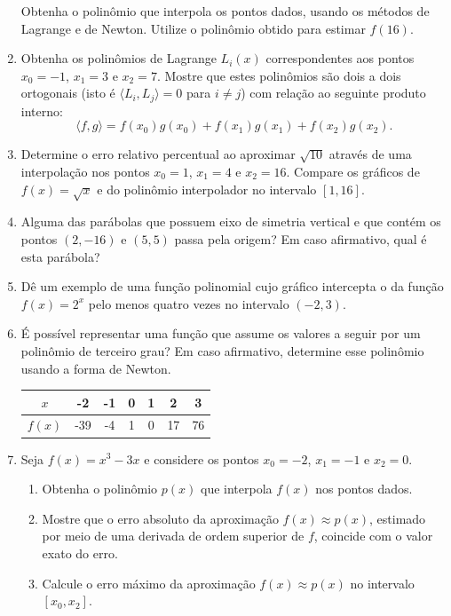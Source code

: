 \documentclass[12pt,a4paper]{article}
\begin{document}
\begin{enumerate}
Obtenha o polinômio que interpola os pontos dados, usando os métodos de Lagrange e de Newton. Utilize o polinômio obtido para estimar $f(16)$.

\item Obtenha os polinômios de Lagrange $L_i(x)$ correspondentes aos pontos $x_0 = -1$, $x_1 = 3$ e $x_2 = 7$. Mostre que estes polinômios são dois a dois ortogonais (isto é $\langle L_i, L_j \rangle = 0$ para $i \neq j$) com relação ao seguinte produto interno:
\[
\langle f, g \rangle = f(x_0) g(x_0) + f(x_1) g(x_1) + f(x_2) g(x_2).
\]
\item Determine o erro relativo percentual ao aproximar $\sqrt{10}$ através de uma interpolação nos pontos $x_0 = 1$, $x_1 = 4$ e $x_2 = 16$. Compare os gráficos de $f(x) = \sqrt{x}$ e do polinômio interpolador no intervalo $[1,16]$.

\item Alguma das parábolas que possuem eixo de simetria vertical e que contém os pontos $(2, -16)$ e $(5, 5)$ passa pela origem? Em caso afirmativo, qual é esta parábola?
\item Dê um exemplo de uma função polinomial cujo gráfico intercepta o da função $f(x) = 2^x$ pelo menos quatro vezes no intervalo $(-2,3)$.
\item É possível representar uma função que assume os valores a seguir por um polinômio de terceiro grau? Em caso afirmativo, determine esse polinômio usando a forma de Newton.
\begin{center}
\begin{tabular}{|c|c|c|c|c|c|c|}
\hline			
   $x$ & -2  & -1 & 0 & 1 &  2 & 3 \\ 
\hline			
$f(x)$ & -39 & -4 & 1 & 0 & 17 & 76\\
\hline			
\end{tabular}
\end{center}

\item Seja $f(x) = x^3 - 3x$ e considere os pontos $x_0 = -2$, $x_1 = -1$ e $x_2 = 0$.
\begin{enumerate}
\item Obtenha o polinômio $p(x)$ que interpola $f(x)$ nos pontos dados.
\item Mostre que o erro absoluto da aproximação $f(x) \approx p(x)$, estimado por meio de uma derivada de ordem superior de $f$, coincide com o valor exato do erro.
\item Calcule o erro máximo da aproximação $f(x)\approx p(x)$ no intervalo $[x_0, x_2]$.
\end{enumerate}


\end{enumerate}
\end{document}

